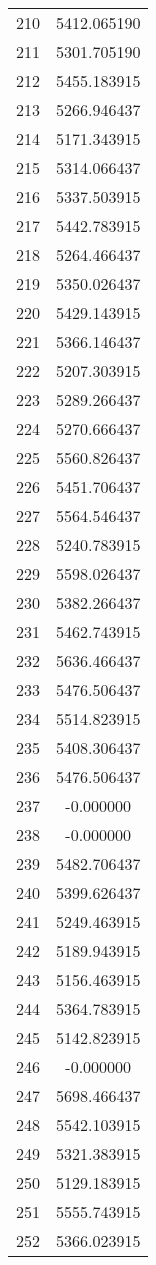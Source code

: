 \documentclass[12pt]{article}
\begin{document}
\begin{longtable}{@{}cc@{}}
210 & 5412.065190 \\
211 & 5301.705190 \\
212 & 5455.183915 \\
213 & 5266.946437 \\
214 & 5171.343915 \\
215 & 5314.066437 \\
216 & 5337.503915 \\
217 & 5442.783915 \\
218 & 5264.466437 \\
219 & 5350.026437 \\
220 & 5429.143915 \\
221 & 5366.146437 \\
222 & 5207.303915 \\
223 & 5289.266437 \\
224 & 5270.666437 \\
225 & 5560.826437 \\
226 & 5451.706437 \\
227 & 5564.546437 \\
228 & 5240.783915 \\
229 & 5598.026437 \\
230 & 5382.266437 \\
231 & 5462.743915 \\
232 & 5636.466437 \\
233 & 5476.506437 \\
234 & 5514.823915 \\
235 & 5408.306437 \\
236 & 5476.506437 \\
237 & -0.000000 \\
238 & -0.000000 \\
239 & 5482.706437 \\
240 & 5399.626437 \\
241 & 5249.463915 \\
242 & 5189.943915 \\
243 & 5156.463915 \\
244 & 5364.783915 \\
245 & 5142.823915 \\
246 & -0.000000 \\
247 & 5698.466437 \\
248 & 5542.103915 \\
249 & 5321.383915 \\
250 & 5129.183915 \\
251 & 5555.743915 \\
252 & 5366.023915 \\

\end{longtable}
\end{document}
